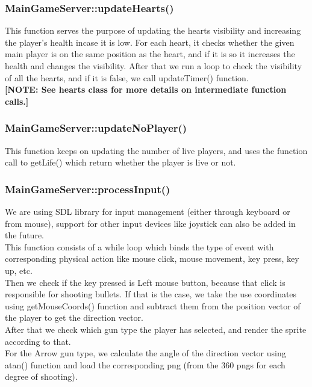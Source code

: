 \documentclass{article}
\begin{document}
\subsubsection{MainGameServer::updateHearts()}
This function serves the purpose of updating the hearts visibility and increasing the player’s health incase it is low. For each heart, it checks whether the given main player is on the same position as the heart, and if it is so it increases the health and changes the visibility. After that we run a loop to check the visibility of all the hearts, and if it is false, we call updateTimer() function. \\
\newline
\textbf{[NOTE: See hearts class for more details on intermediate function calls.]}
\newline

\subsubsection{MainGameServer::updateNoPlayer()}
This function keeps on updating the number of live players, and uses the function call to getLife() which return whether the player is live or not.
\newline

\subsubsection{MainGameServer::processInput() }
We are using SDL library for input management (either through keyboard or from mouse), support for other input devices like joystick can also be added in the future. \\

This function consists of a while loop which binds the type of event with corresponding physical action like mouse click, mouse movement, key press, key up, etc. \\

Then we check if the key pressed is Left mouse button, because that click is responsible for shooting bullets. If that is the case, we take the use coordinates using getMouseCoords() function and subtract them from the position vector of the player to get the direction vector. \\
After that we check which gun type the player has selected, and render the sprite according to that. \\

For the Arrow gun type, we calculate the angle of the direction vector using atan() function and load the corresponding png (from the 360 pngs for each degree of shooting). \\
\end{document}
